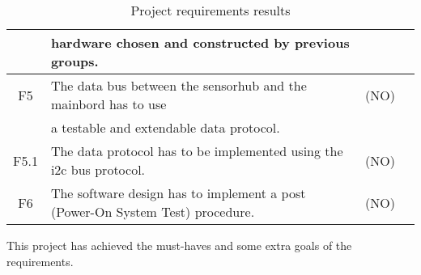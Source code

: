 \begin{table}[hb!]
\begin{tabular}{ |c|l|c|c| }
       & hardware chosen and constructed by previous groups. & \\
\hline
 F5    & The data bus between the sensorhub and the mainbord has to use & (NO)\\
       & a testable and extendable data protocol. &   \\
 \hline
 F5.1  & The data protocol has to be implemented using the i2c bus protocol. & (NO) \\
 \hline
 F6    & The software design has to implement a post (Power-On System Test) procedure. & (NO) \\ 
 \hline
\end{tabular}
 \caption{Project requirements results}
 \label{tab:functional_requirements}
\end{table}
This project has achieved the must-haves and some extra goals of the requirements. 
